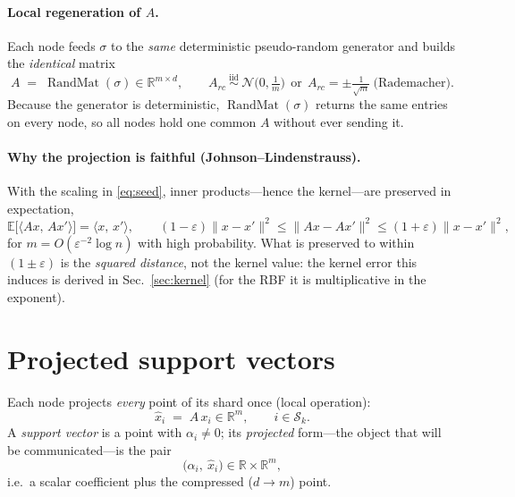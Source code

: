 \documentclass[11pt]{article}
\newcommand{\R}{\mathbb{R}}
\newcommand{\E}{\mathbb{E}}
\newcommand{\ip}[2]{\langle #1,\, #2\rangle}
\DeclareMathOperator{\RandMat}{RandMat}
\begin{document}
\paragraph{Local regeneration of $A$.} Each node feeds $\sigma$ to the \emph{same}
deterministic pseudo-random generator and builds the \emph{identical} matrix
\begin{equation}\label{eq:seed}
  A \;=\; \RandMat(\sigma)\in\R^{m\times d},
  \qquad
  A_{rc}\ \overset{\text{iid}}{\sim}\ \mathcal N\!\big(0,\tfrac1m\big)
  \ \ \text{or}\ \
  A_{rc}=\pm\tfrac{1}{\sqrt m}\ \text{(Rademacher)} .
\end{equation}
Because the generator is deterministic, $\RandMat(\sigma)$ returns the same entries
on every node, so all nodes hold one common $A$ without ever sending it.

\paragraph{Why the projection is faithful (Johnson--Lindenstrauss).} With the
scaling in \eqref{eq:seed}, inner products---hence the kernel---are preserved in
expectation,
\begin{equation}\label{eq:jl}
  \E\!\big[\ip{A x}{A x'}\big]=\ip{x}{x'},
  \qquad
  (1-\varepsilon)\|x-x'\|^2\le\|Ax-Ax'\|^2\le(1+\varepsilon)\|x-x'\|^2 ,
\end{equation}
for $m=O(\varepsilon^{-2}\log n)$ with high probability. What is preserved to
within $(1\pm\varepsilon)$ is the \emph{squared distance}, not the kernel value: the
kernel error this induces is derived in Sec.~\ref{sec:kernel} (for the RBF it is
multiplicative in the exponent).

\section{Projected support vectors}

Each node projects \emph{every} point of its shard once (local operation):
\begin{equation}\label{eq:proj}
  \hat x_i \;=\; A\,x_i \in\R^{m}, \qquad i\in\mathcal{S}_k .
\end{equation}
A \emph{support vector} is a point with $\alpha_i\neq0$; its \emph{projected}
form---the object that will be communicated---is the pair
\begin{equation}\label{eq:psv}
  \big(\alpha_i,\ \hat x_i\big)\in\R\times\R^{m},
\end{equation}
i.e.\ a scalar coefficient plus the compressed ($d\!\to\!m$) point.
\end{document}
